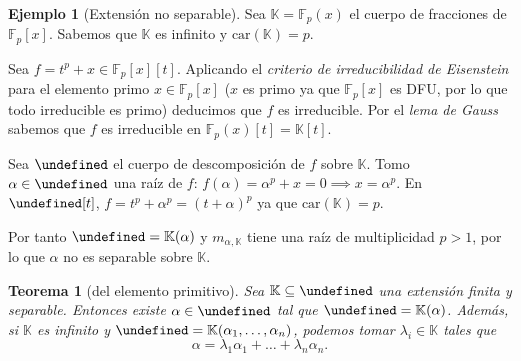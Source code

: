 \documentclass[10pt, spanish]{report}
\newtheorem{tma}{Teorema}[chapter]
\theoremstyle{definition}
\newtheorem*{ej}{Ejemplo}
\theoremstyle{custom}
\theoremstyle{remark}
\newcommand{\F}{\mathbb{F}}
\newcommand{\K}{\mathbb{K}}
\let\L\undefined
\newcommand{\L}{\mathbb{L}}
\newcommand{\car}[1]{\text{car}(#1)}
\begin{document}
\begin{ej}[Extensión no separable]
    Sea $\K=\F_p(x)$ el cuerpo de fracciones de $\F_p[x]$. Sabemos que $\K$ es
    infinito y $\car{\K}=p$.

    Sea $f=t^p+x\in\F_p[x][t]$. Aplicando el \textit{criterio de irreducibilidad
    de Eisenstein} para el elemento primo $x\in\F_p[x]$ ($x$ es primo ya que
    $\F_p[x]$ es DFU, por lo que todo irreducible es primo) deducimos que $f$ es
    irreducible.
    Por el \textit{lema de Gauss} sabemos que $f$ es irreducible en
    $\F_p(x)[t]=\K[t]$.

    Sea $\L$ el cuerpo de descomposición de $f$ sobre $\K$. Tomo $\alpha\in\L$
    una raíz de $f$: $f(\alpha)=\alpha^p+x=0\implies x=\alpha^p$.
    En $\L[t]$, $f=t^p+\alpha^p=(t+\alpha)^p$ ya que $\car{\K}=p$.

    Por tanto $\L=\K(\alpha)$ y $m_{\alpha,\K}$ tiene una raíz de multiplicidad
    $p>1$, por lo que $\alpha$ no es separable sobre $\K$.
\end{ej}

\begin{tma}[del elemento primitivo]
    Sea $\K\subseteq\L$ una extensión finita y separable. Entonces existe
    $\alpha\in\L$ tal que $\L=\K(\alpha)$. Además, si $\K$ es infinito y
    $\L=\K(\alpha_1,\ldots,\alpha_n)$, podemos tomar $\lambda_i\in\K$ tales que
    \[\alpha=\lambda_1\alpha_1+\ldots+\lambda_n\alpha_n.\]
\end{tma}
\end{document}
